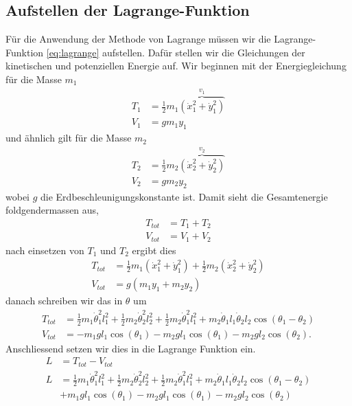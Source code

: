 \subsection{Aufstellen der Lagrange-Funktion}
Für die Anwendung der Methode von Lagrange müssen wir die Lagrange-Funktion 
\eqref{eq:lagrange} aufstellen.
Dafür stellen wir die Gleichungen der kinetischen und potenziellen Energie auf.
Wir beginnen mit der Energiegleichung für die Masse \(m_1\)
\begin{align}
    T_1 &= \frac{1}{2} m_1 
    \overbrace{( \dot{x}_1^2 + \dot{y}_1^2 )}^{v_1}\\
    V_1 &= g m_1 y_1
\end{align}
und ähnlich gilt für die Masse \(m_2\)
\begin{align}
    T_2 &= \frac{1}{2} m_2 
    \overbrace{( \dot{x}_2^2 + \dot{y}_2^2 )}^{v_2} \\
    V_2 &= g m_2 y_2
\end{align}
wobei \(g\) die Erdbeschleunigungskonstante ist.
Damit sieht die Gesamtenergie foldgendermassen aus,
\begin{align}
    T_{tot} &= T_1 + T_2 \\
    V_{tot} &= V_1 + V_2
\end{align}
nach einsetzen von \(T_1\) und \(T_2\) ergibt dies
\begin{align}
    T_{tot} &= \frac{1}{2} m_1 ( \dot{x}_1^2 + \dot{y}_1^2 ) +
    \frac{1}{2} m_2 ( \dot{x}_2^2 + \dot{y}_2^2 ) \\
    V_{tot} &= g ( m_1 y_1 + m_2 y_2 )
\end{align}
danach schreiben wir das in \(\theta\) um
\begin{align}
    T_{tot} &= \frac{1}{2} m_1 \dot{\theta}^2_1 l_1^2 + 
    \frac{1}{2} m_2 \dot{\theta}^2_2 l_2^2 + \frac{1}{2}
    m_2 \dot{\theta}^2_1 l_1^2 + 
    m_2 \dot{\theta}_1 l_1 \dot{\theta}_2 l_2 
    \cos(\theta_1 - \theta_2) \\
    V_{tot} &= -m_1 g l_1 \cos(\theta_1) -
    m_2 g l_1 \cos(\theta_1) -
    m_2 g l_2 \cos(\theta_2).
\end{align}
Anschliessend setzen wir dies in die Lagrange Funktion ein.
\begin{align}
    L &= T_{tot} - V_{tot} \\
    L &=  \frac{1}{2} m_1 \dot{\theta}^2_1 l_1^2 + 
    \frac{1}{2} m_2 \dot{\theta}^2_2 l_2^2 + \frac{1}{2}
    m_2 \dot{\theta}^2_1 l_1^2 + 
    m_2 \dot{\theta}_1 l_1 \dot{\theta}_2 l_2 
    \cos(\theta_1 - \theta_2) \\ \nonumber
    &+ m_1 g l_1 \cos(\theta_1) -
    m_2 g l_1 \cos(\theta_1) -
    m_2 g l_2 \cos(\theta_2)
\end{align}

